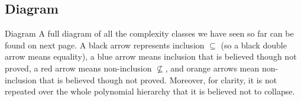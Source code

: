 \documentclass[a4paper]{article}
\begin{document}
\subsection{Diagram}

\begin{parag}{Diagram}
    A full diagram of all the complexity classes we have seen so far can be found on next page. A black arrow represents inclusion $\subseteq$ (so a black double arrow means equality), a blue arrow means inclusion that is believed though not proved, a red arrow means non-inclusion $\not\subseteq$, and orange arrows mean non-inclusion that is believed though not proved. Moreover, for clarity, it is not repeated over the whole polynomial hierarchy that it is believed not to collapse.
\end{parag}

\clearpage
\vspace*{\fill}
\vspace*{\fill}
\clearpage
\end{document}

